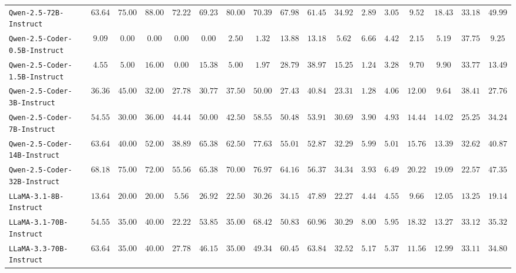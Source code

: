 \begin{table*}[]
{\begin{tabular}{lcccccccccccccccc}
\texttt{Qwen-2.5-72B-Instruct} & $63.64$ & $75.00$ & $88.00$ & $72.22$ & $69.23$ & $80.00$ & $70.39$ & $67.98$ & $61.45$ & $34.92$ & $2.89$ & $3.05$ & $9.52$ & $18.43$ & $33.18$ & $49.99$ \\
\texttt{Qwen-2.5-Coder-0.5B-Instruct} & $9.09$ & $0.00$ & $0.00$ & $0.00$ & $0.00$ & $2.50$ & $1.32$ & $13.88$ & $13.18$ & $5.62$ & $6.66$ & $4.42$ & $2.15$ & $5.19$ & $37.75$ & $9.25$ \\
\texttt{Qwen-2.5-Coder-1.5B-Instruct} & $4.55$ & $5.00$ & $16.00$ & $0.00$ & $15.38$ & $5.00$ & $1.97$ & $28.79$ & $38.97$ & $15.25$ & $1.24$ & $3.28$ & $9.70$ & $9.90$ & $33.77$ & $13.49$ \\
\texttt{Qwen-2.5-Coder-3B-Instruct} & $36.36$ & $45.00$ & $32.00$ & $27.78$ & $30.77$ & $37.50$ & $50.00$ & $27.43$ & $40.84$ & $23.31$ & $1.28$ & $4.06$ & $12.00$ & $9.64$ & $38.41$ & $27.76$ \\
\texttt{Qwen-2.5-Coder-7B-Instruct} & $54.55$ & $30.00$ & $36.00$ & $44.44$ & $50.00$ & $42.50$ & $58.55$ & $50.48$ & $53.91$ & $30.69$ & $3.90$ & $4.93$ & $14.44$ & $14.02$ & $25.25$ & $34.24$ \\
\texttt{Qwen-2.5-Coder-14B-Instruct} & $63.64$ & $40.00$ & $52.00$ & $38.89$ & $65.38$ & $62.50$ & $77.63$ & $55.01$ & $52.87$ & $32.29$ & $5.99$ & $5.01$ & $15.76$ & $13.39$ & $32.62$ & $40.87$ \\
\texttt{Qwen-2.5-Coder-32B-Instruct} & $68.18$ & $75.00$ & $72.00$ & $55.56$ & $65.38$ & $70.00$ & $76.97$ & $64.16$ & $56.37$ & $34.34$ & $3.93$ & $6.49$ & $20.22$ & $19.09$ & $22.57$ & $47.35$ \\
\texttt{LLaMA-3.1-8B-Instruct} & $13.64$ & $20.00$ & $20.00$ & $5.56$ & $26.92$ & $22.50$ & $30.26$ & $34.15$ & $47.89$ & $22.27$ & $4.44$ & $4.55$ & $9.66$ & $12.05$ & $13.25$ & $19.14$ \\
\texttt{LLaMA-3.1-70B-Instruct} & $54.55$ & $35.00$ & $40.00$ & $22.22$ & $53.85$ & $35.00$ & $68.42$ & $50.83$ & $60.96$ & $30.29$ & $8.00$ & $5.95$ & $18.32$ & $13.27$ & $33.12$ & $35.32$ \\
\texttt{LLaMA-3.3-70B-Instruct} & $63.64$ & $35.00$ & $40.00$ & $27.78$ & $46.15$ & $35.00$ & $49.34$ & $60.45$ & $63.84$ & $32.52$ & $5.17$ & $5.37$ & $11.56$ & $12.99$ & $33.11$ & $34.80$ \\
\bottomrule
\end{tabular}}
\end{table*}